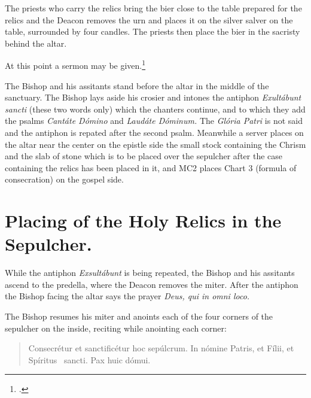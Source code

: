 \documentclass[letterpaper]{report}
\newcommand\src{\textsc{S.R.C.}}
\begin{document}
{    \rubric The priests who carry the relics bring the bier close to the table
    prepared for the relics and the Deacon removes the urn and places it on the
    silver salver on the table, surrounded by four candles. The priests then
    place the bier in the sacristy behind the altar.

    \rubric At this point a sermon may be given.\footcite[The exhortation
    here spoken of, the decrees of the Council of Trent which according to the
    Pontifical are now read by the archdeacon (any priest), the address of the
    Bishop to the founder of the church and the latter's reply may be omitted.
    --- \src, May 17, 1890, n. 3729 ad VIII.][footnote 2, p. 82.]{consecranda}

    \rubric The Bishop and his assitants stand before the altar in the middle
    of the sanctuary. The Bishop lays aside his crosier and intones the
    antiphon \textit{Exult\'abunt sancti} (these two words only) which the
    chanters continue, and to which they add the psalms \textit{Cant\'ate
    D\'omino} and \textit{Laud\'ate D\'ominum.} The \textit{Gl\'oria Patri} is
    not said and the antiphon is repated after the second psalm. Meanwhile a
    server places on the altar near the center on the epistle side the small
    stock containing the Chrism and the slab of stone which is to be placed
    over the sepulcher after the case containing the relics has been placed in
    it, and MC2 places Chart 3 (formula of consecration) on the gospel side.

    \section{Placing of the Holy Relics in the Sepulcher.}

    \rubric While the antiphon \textit{Exsult\'abunt} is being repeated, the
    Bishop and his assitants ascend to the predella, where the Deacon removes
    the miter. After the antiphon the Bishop facing the altar says the prayer
    \textit{Deus, qui in omni loco.}

    \rubric The Bishop resumes his miter and anoints each of the four corners
    of the sepulcher on the inside, reciting while anointing each corner:

    \begin{quote}
        Conse\cross crétur et sancti\cross ficétur hoc sepúlcrum. In nómine
        Pa\cross tris, et Fí\cross lii, et Spíritus \cross\ sancti. Pax huic
        dómui.
    \end{quote}

}
\end{document}
